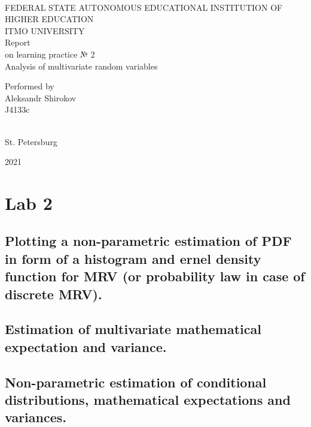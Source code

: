 \documentclass[%
12pt, %
final, %
oneside, %
onecolumn, %
centertags]{article} %
\theoremstyle{plain}
\theoremstyle{definition}
\theoremstyle{remark}
\begin{document}
	\begin{titlepage} 
		\begin{center}
		\textbf{}\\[2.0cm]
		\LARGE FEDERAL STATE AUTONOMOUS EDUCATIONAL INSTITUTION OF HIGHER EDUCATION \\[0.5cm]
		\Large ITMO UNIVERSITY \\[3cm]
		\LARGE Report\\
		\Large on learning practice № 2\\
		\Large Analysis of multivariate random variables \\[4cm]


		\begin{flushright}
		Performed by\\
		Aleksandr Shirokov\\
		J4133c\\
		\ \\

		\end{flushright}

		\vfill 

		{\Large {St. Petersburg}} \par
		{\Large {2021}}
		\end{center} 
	\end{titlepage}

\tableofcontents
\newpage

\section{Lab 2}

\subsection{Plotting a non-parametric estimation of PDF in form of a histogram and ernel density function for MRV (or probability law in case of discrete MRV).}

\subsection{Estimation of multivariate mathematical expectation and variance.}

\subsection{Non-parametric estimation of conditional distributions, mathematical expectations and variances.}
\end{document}
